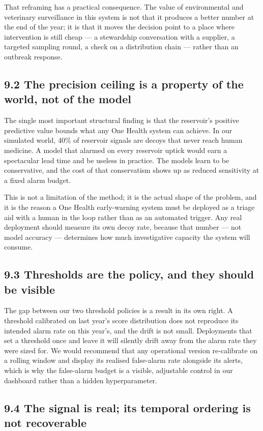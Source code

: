 \documentclass[11pt,a4paper]{article}
\begin{document}
That reframing has a practical consequence. The value of environmental and veterinary surveillance in this system is not that it produces a better number at the end of the year; it is that it moves the decision point to a place where intervention is still cheap — a stewardship conversation with a supplier, a targeted sampling round, a check on a distribution chain — rather than an outbreak response.

\subsection*{9.2 The precision ceiling is a property of the world, not of the model}

The single most important structural finding is that the reservoir's positive predictive value bounds what any One Health system can achieve. In our simulated world, 40\% of reservoir signals are decoys that never reach human medicine. A model that alarmed on every reservoir uptick would earn a spectacular lead time and be useless in practice. The models learn to be conservative, and the cost of that conservatism shows up as reduced sensitivity at a fixed alarm budget.

This is not a limitation of the method; it is the actual shape of the problem, and it is the reason a One Health early-warning system must be deployed as a triage aid with a human in the loop rather than as an automated trigger. Any real deployment should measure its own decoy rate, because that number — not model accuracy — determines how much investigative capacity the system will consume.

\subsection*{9.3 Thresholds are the policy, and they should be visible}

The gap between our two threshold policies is a result in its own right. A threshold calibrated on last year's score distribution does not reproduce its intended alarm rate on this year's, and the drift is not small. Deployments that set a threshold once and leave it will silently drift away from the alarm rate they were sized for. We would recommend that any operational version re-calibrate on a rolling window and display its realised false-alarm rate alongside its alerts, which is why the false-alarm budget is a visible, adjustable control in our dashboard rather than a hidden hyperparameter.

\subsection*{9.4 The signal is real; its temporal ordering is not recoverable}
\end{document}

